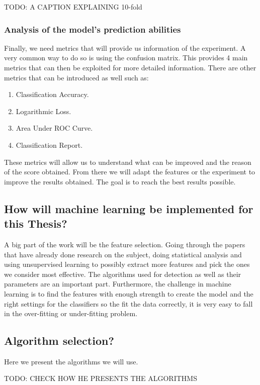 TODO:  A CAPTION EXPLAINING 10-fold

\subsubsection{Analysis of the model's prediction abilities}
Finally, we need metrics that will provide us information of the experiment. A very common way to do so is using the confusion matrix. This provides 4 main metrics that can then be exploited for more detailed information. There are other metrics \cite{ml-metrics} that can be introduced as well such as: 
\begin{enumerate}
\item Classification Accuracy.
\item Logarithmic Loss.
\item Area Under ROC Curve.
\item Classification Report.
\end{enumerate}
These metrics will allow us to understand what can be improved and the reason of the score obtained. From there we will adapt the features or the experiment to improve the results obtained. The goal is to reach the best results possible.

\subsection{How will machine learning be implemented for this Thesis?}
A big part of the work will be the feature selection. Going through the papers that have already done research on the subject, doing statistical analysis and using unsupervised learning to possibly extract more features and pick the ones we consider most effective. The algorithms used for detection as well as their parameters are an important part. Furthermore, the challenge in machine learning is to find the features with enough strength to create the model and the right settings for the classifiers so the fit the data correctly, it is very easy to fall in the over-fitting or under-fitting problem.

\subsection{Algorithm selection?}
Here we present the algorithms we will use.

TODO: CHECK HOW HE PRESENTS THE ALGORITHMS

